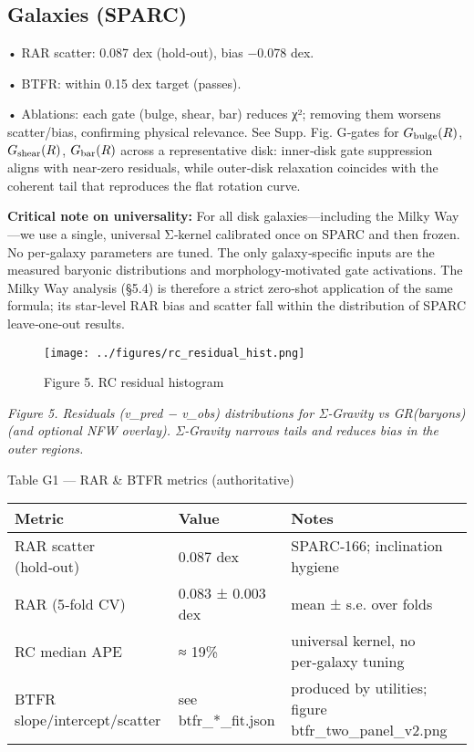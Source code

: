 \documentclass[11pt,a4paper]{article}
\begin{document}
\subsection{Galaxies (SPARC)}


• RAR scatter: 0.087 dex (hold‑out), bias −0.078 dex.  

• BTFR: within 0.15 dex target (passes).  

• Ablations: each gate (bulge, shear, bar) reduces χ²; removing them worsens scatter/bias, confirming physical relevance. See Supp. Fig. G‑gates for $G_{\rm bulge}(R)$, $G_{\rm shear}(R)$, $G_{\rm bar}(R)$ across a representative disk: inner‑disk gate suppression aligns with near‑zero residuals, while outer‑disk relaxation coincides with the coherent tail that reproduces the flat rotation curve.


\textbf{Critical note on universality:} For all disk galaxies—including the Milky Way—we use a single, universal Σ‑kernel calibrated once on SPARC and then frozen. No per‑galaxy parameters are tuned. The only galaxy‑specific inputs are the measured baryonic distributions and morphology‑motivated gate activations. The Milky Way analysis (§5.4) is therefore a strict zero‑shot application of the same formula; its star‑level RAR bias and scatter fall within the distribution of SPARC leave‑one‑out results.


\begin{figure}[h]
\centering
\texttt{[image: ../figures/rc\_residual\_hist.png]}
\caption{Figure 5. RC residual histogram}
\end{figure}


\textit{Figure 5. Residuals (v\_pred − v\_obs) distributions for Σ‑Gravity vs GR(baryons) (and optional NFW overlay). Σ‑Gravity narrows tails and reduces bias in the outer regions.}


Table G1 — RAR \& BTFR metrics (authoritative)


\begin{table}[h]
\centering
\begin{tabular}{lll}
\toprule
Metric & Value & Notes \\
\midrule
RAR scatter (hold‑out) & 0.087 dex & SPARC‑166; inclination hygiene \\
RAR (5‑fold CV) & 0.083 ± 0.003 dex & mean ± s.e. over folds \\
RC median APE & ≈ 19\% & universal kernel, no per‑galaxy tuning \\
BTFR slope/intercept/scatter & see btfr\_*\_fit.json & produced by utilities; figure btfr\_two\_panel\_v2.png \\
\bottomrule
\end{tabular}
\end{table}
\end{document}
